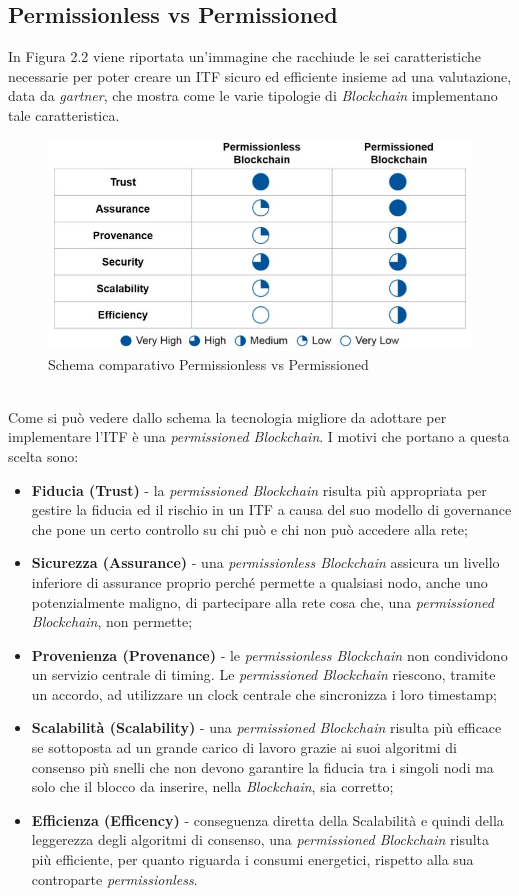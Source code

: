 \subsection{Permissionless vs Permissioned}
In Figura 2.2 viene riportata un'immagine che racchiude le sei caratteristiche necessarie per poter creare un \gls{ITF} sicuro ed efficiente insieme ad una valutazione, data da \emph{\gls{gartner}}\glsfirstoccur, che mostra come le varie tipologie di \textit{Blockchain} implementano tale caratteristica.
\begin{figure}[h]
	\centering
	\includegraphics[scale=0.50]{immagini/blockchain_ability_to_implement_ITF}
	\caption{Schema comparativo Permissionless vs Permissioned}
\end{figure} 
\\
Come si può vedere dallo schema la tecnologia migliore da adottare per implementare l'\gls{ITF} è una \textit{permissioned Blockchain}.
I motivi che portano a questa scelta sono:
\begin{itemize}
	\item \textbf{Fiducia (Trust)} - la \textit{permissioned Blockchain} risulta più appropriata per gestire la fiducia ed il rischio in un \gls{ITF} a causa del suo modello di governance che pone un certo controllo su chi può e chi non può accedere alla rete; 
	\item \textbf{Sicurezza (Assurance)} - una \textit{permissionless Blockchain} assicura un livello inferiore di assurance proprio perché permette a qualsiasi nodo, anche uno potenzialmente maligno, di partecipare alla rete cosa che, una \textit{permissioned Blockchain}, non permette;
	\item \textbf{Provenienza (Provenance)} - le \textit{permissionless Blockchain} non condividono un servizio centrale di timing. Le \textit{permissioned Blockchain} riescono, tramite un accordo, ad utilizzare un clock centrale che sincronizza i loro timestamp;
	\item \textbf{Scalabilità (Scalability)} - una \textit{permissioned Blockchain} risulta più efficace se sottoposta ad un grande carico di lavoro grazie ai suoi algoritmi di consenso più snelli che non devono garantire la fiducia tra i singoli nodi ma solo che il blocco da inserire, nella \textit{Blockchain}, sia corretto;
	\item \textbf{Efficienza (Efficency)} - conseguenza diretta della Scalabilità e quindi della leggerezza degli algoritmi di consenso, una \textit{permissioned Blockchain} risulta più efficiente, per quanto riguarda i consumi energetici, rispetto alla sua controparte \textit{permissionless}.
\end{itemize}
